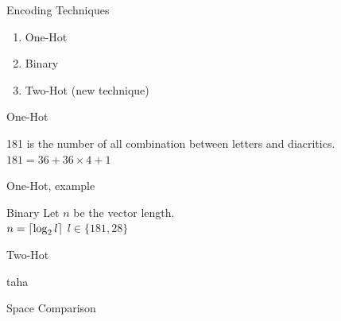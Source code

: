 \documentclass[10pt]{beamer}
\DeclarePairedDelimiter{\ceil}{\lceil}{\rceil}
\begin{document}
\begin{frame}[fragile]{Encoding Techniques}
\begin{enumerate}
    \item One-Hot
    \item Binary
    \item \alert{Two-Hot} (new technique)

\end{enumerate}
\end{frame}

\begin{frame}[fragile]{One-Hot}
    \begin{center}
        
    \end{center}
181 is the number of all combination between letters and diacritics.\\
$181 = 36 + 36 \times 4 + 1$
\end{frame}

\begin{frame}[fragile]{One-Hot, example}
    \begin{center}
        
    \end{center}
\end{frame}

\begin{frame}[fragile]{Binary}
Let $n$ be the vector length.\\
$n = \ceil*{\log_2 l}$ $l \in \{181, 28\}$
    \begin{center}
        
    \end{center}
\end{frame}

\begin{frame}[fragile]{Two-Hot}
    \begin{center}
        
    \end{center}
\end{frame}



\begin{frame}[fragile]{taha}
\end{frame}


\begin{frame}[fragile]{Space Comparison}
    \begin{center}
        
    \end{center}
\end{frame}
\end{document}
